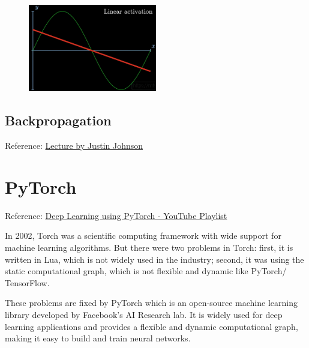 \documentclass[12pt, a4paper]{article}
\begin{document}
\begin{figure}[h]   %
    \centering
    \includegraphics[width=0.5\textwidth]{Linear Activation.png} %
    \label{fig:veri1}
\end{figure}

\subsection{Backpropagation}

Reference: \href{https://youtu.be/dB-u77Y5a6A?si=pFKasZnTR1_GaS5v}{Lecture by Justin Johnson}

\section{PyTorch}

Reference: \href{https://youtube.com/playlist?list=PLKnIA16_Rmvboy8bmDCjwNHgTaYH2puK7&si=q46c4wbwDzqZEilV}{Deep Learning using PyTorch - YouTube Playlist} 

\vspace{1em}

In 2002, Torch was a scientific computing framework with wide support for machine learning algorithms. 
But there were two problems in Torch: first, it is written in Lua, which is not widely used in the industry; second, it was using the static computational graph, which is not flexible and dynamic like PyTorch/ TensorFlow.

\vspace{0.5em}

These problems are fixed by PyTorch which is an open-source machine learning library developed by Facebook's AI Research lab. It is widely used for deep learning applications and provides a flexible and dynamic computational graph, making it easy to build and train neural networks.

\vspace{0.5em}
\end{document}
